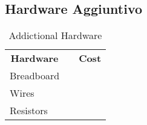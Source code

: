 \subsection{Hardware Aggiuntivo}

\begin{table}[]
\centering
\begin{tabular}{lll}
\multicolumn{1}{c}{\textbf{Hardware}} &  & \multicolumn{1}{c}{\textbf{Cost}} \\
Breadboard                            &  &                                   \\
Wires                                 &  &                                   \\
Resistors                             &  &                                  
\end{tabular}
\caption{Addictional Hardware}
\label{Addictional Hardware}
\end{table}
